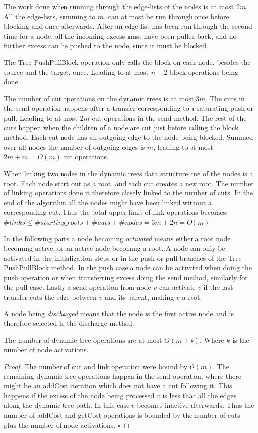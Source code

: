 The work done when running through the edge-lists of the nodes is at most $2m$. All the edge-lists, summing to $m$, can at most be run through once before blocking and once
afterwards. After an edge-list has been run through the second time for a node, all the incoming excess must have been pulled back, and no further excess can be pushed
to the node, since it must be blocked.

The Tree-PushPullBlock operation only calls the block on each node, besides the source and the target, once. Leading to at most $n-2$ block operations being done.

The number of cut operations on the dynamic trees is at most $3m$. The cuts in the send operation happens after a transfer corresponding to a saturating push or pull. 
Leading to at most $2m$ cut operations in the send method. The rest of the cuts happen when the children of a node are cut just before calling the block method.
Each cut node has an outgoing edge to the node being blocked. Summed over all nodes the number of outgoing edges is $m$, leading to at most $2m + m = O(m)$ cut operations.

When linking two nodes in the dynamic trees data structure one of the nodes is a root. Each node start out as a root, and each cut creates a new root. 
The number of linking operations done it therefore closely linked to the number of cuts. In the end of the algorithm all the nodes might have been linked without 
a corresponding cut. Thus the total upper limit of link operations becomes: $\#links \leq \#starting\_roots + \#cuts + \#nodes = 3m + 2n = O(m)$

In the following parts a node becoming \emph{activated} means either a root node becoming active, or an active node becoming a root.
A node can only be activated in the initialization steps or in the push or pull branches of the Tree-PushPullBlock method. In the push case 
a node can be activated when doing the push operation or when transferring excess doing the send method, similarly for the pull case.
Lastly a send operation from node $v$ can activate $v$ if the last transfer cuts the edge between $v$ and its parent, making $v$ a root.

A node being \emph{discharged} means that the node is the first active node and is therefore selected in the discharge method. 

\begin{lemma}\label{BF-Dynamic-Trees-Cost}
	The number of dynamic tree operations are at most $O(m + k)$. Where $k$ is the number of node activations.
\end{lemma}
\begin{proof}
	The number of cut and link operation were bound by $O(m)$. The remaining dynamic tree operations
	happen in the send operation, where there might be an addCost iteration which does not have a cut following it. 
	This happens if the excess of the node being processed $v$ is less than all the edges along the dynamic tree path. 
	In this case $v$ becomes inactive afterwards. 
	Thus the number of addCost and getCost operations is bounded by the number of cuts plus the number of node activations. $\square$
\end{proof}

